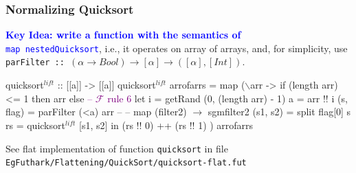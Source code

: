 \documentclass{beamer}
\newcommand{\blue}[1]{\textcolor{Blue}{{#1}}}
\newcommand{\purple}[1]{\textcolor{Purple}{{#1}}}
\newcommand{\emp}[1]{\textcolor{DikuRed}{ #1}}
\newcommand{\mymath}[1]{$ #1 $}
\newcommand{\myindu}[1]{^{#1}}
\begin{document}
\begin{frame}[fragile,t]
  \frametitle{Normalizing Quicksort}

\blue{\bf Key Idea: write a function with the semantics of}\\
\blue{\tt map nestedQuicksort}, i.e., it operates on array of arrays,
 and, for simplicity, use
{\tt parFilter :: $(\alpha\rightarrow Bool)\rightarrow[\alpha]\rightarrow([\alpha],[Int])$}.

\bigskip

\begin{colorcode}[fontsize=\scriptsize]
quicksort\mymath{\myindu{lift}} :: [[a]] -> [[a]]
quicksort\mymath{\myindu{lift}} arrofarrs = 
  map (\mymath{\backslash}arr ->
          if  (length arr) <= 1 then arr else \purple{-- \mymath{\mathcal{F}} rule 6}
          let i  = getRand (0, (length arr) - 1)
              a  = arr !! i
              (s, flag) = \emp{parFilter} (<a) arr -- \emp{-- map (filter2) \mymath{\rightarrow} sgmfilter2}
              (s1, s2)  = split flag[0] s
              \alert{rs = quicksort\mymath{\myindu{lift}} [s1, s2]}
          in  (rs !! 0) ++ (rs !! 1)
      ) arrofarrs
\end{colorcode}

See flat implementation of function {\tt quicksort} in file \\
{\tt EgFuthark/Flattening/QuickSort/quicksort-flat.fut}

\end{frame}
\end{document}
